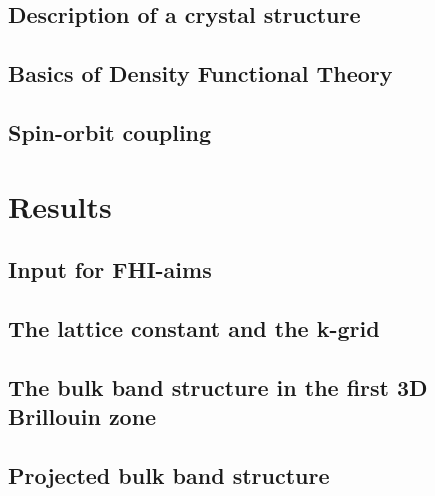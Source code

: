 \documentclass[english, a4, 12pt]{scrartcl}
\begin{document}
	\subsection{Description of a crystal structure}
	
	
	\subsection{Basics of Density Functional Theory}
	
	
	\subsection{Spin-orbit coupling} \label{chapter_soc}
	
\section{Results}
	\subsection{Input for FHI-aims} \label{FHI-aims}
	
	
	\FloatBarrier
	\subsection{The lattice constant and the k-grid} \label{lattice_k-grid}
	
	
	\subsection{The bulk band structure in the first 3D Brillouin zone}
	
	
	\subsection{Projected bulk band structure}
	
	
%	
\FloatBarrier
\end{document}
